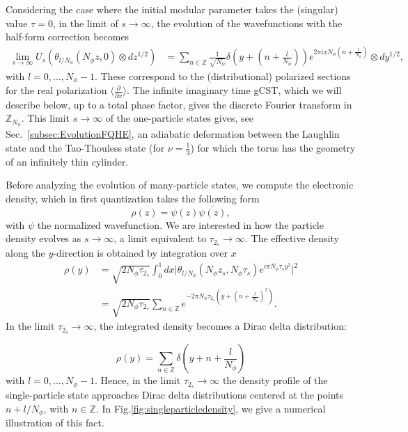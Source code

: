 \documentclass[a4paper,11pt]{article}
\begin{document}
 Considering the case where the initial modular parameter takes the (singular) value $\tau = 0$, in the limit of $s\rightarrow \infty$, the evolution of the wavefunctions with the half-form correction becomes
\begin{align*}
\lim_{s\rightarrow \infty} U_{s}\left(\theta_{l/N_{\phi}}(N_{\phi}z,0)\otimes dz^{1/2}\right) &= \sum_{n\in\mathbb{Z}}\frac{1}{\sqrt{N_{\phi}}}\delta\left(y+\left(n+\frac{l}{N_{\phi}}\right)\right)e^{2\pi ixN_{\phi}\left(n+\frac{l}{N_{\phi}}\right)}\otimes dy^{1/2},
\end{align*}
with $l=0,...,N_{\phi}-1$. These correspond to the (distributional) polarized sections for the real polarization $\Big\langle \frac{\partial}{\partial x}\Big\rangle$. The infinite imaginary time gCST, which we will describe below, up to a total phase factor, gives the discrete Fourier transform in $\mathbb{Z}_{N_{\phi}}$. This limit $s\to\infty$ of the one-particle states 
gives, see Sec.~\ref{subsec:EvolutionFQHE}, an adiabatic deformation between the Laughlin state and the Tao-Thouless state (for $\nu=\frac13$) for which the torus has the geometry of an infinitely thin cylinder.

Before analyzing the evolution of many-particle states, we compute the electronic density, which in first quantization takes the following form
\begin{equation}
    \rho(z) = \psi(z)\overline{\psi(z)},
    \label{densitysecondquantization}
\end{equation}
with $\psi$ the normalized wavefunction.
We are interested in how the particle density evolves as $s\rightarrow \infty$, a limit equivalent to $\tau_{2_s}\rightarrow \infty$. The effective density along the $y$-direction is obtained by integration over $x$
\begin{align}
\rho(y) &= \sqrt{2N_{\phi}\tau_{2_s}}\int_{0}^{1}dx\Big|\theta_{l/N_{\phi}}(N_{\phi}z_s,N_{\phi}\tau_s)e^{i\pi N_{\phi}\tau_s y^2}\Big|^2\nonumber\\
&= \sqrt{2N_{\phi}\tau_{2_s}}\sum_{n\in\mathbb{Z}}e^{-2\pi N_{\phi}\tau_{2_s}\left(y+\left(n+\frac{l}{N_{\phi}}\right)^2\right)}.
\label{eq:particledensitysingle}
\end{align}
In the limit $\tau_{2_s}\rightarrow \infty$, the integrated density becomes a Dirac delta distribution:

\begin{equation}
    \rho(y) = \sum_{n\in\mathbb{Z}} \delta\left(y+n+\frac{l}{N_{\phi}}\right)
    \label{integrateddensitysingleparticle}
\end{equation}
with $l=0,...,N_{\phi}-1$. Hence, in the limit $\tau_{2_s}\rightarrow \infty$ the density profile of the single-particle state approaches Dirac delta distributions centered at the points $n+l/N_{\phi}$, with $n\in\mathbb{Z}$. In Fig.\ref{fig:singleparticledensity}, we give a numerical illustration of this fact.
\end{document}
